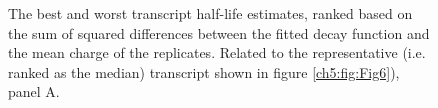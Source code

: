 \begin{figure}[ht]
    \centering
    \caption[Best and worst transcript half-life estimates.]{
    The best and worst transcript half-life estimates, ranked based on the sum of squared differences between the fitted decay function and the mean charge of the replicates.
    Related to the representative (i.e. ranked as the median) transcript shown in figure \ref{ch5:fig:Fig6}), panel A.
    }
    \label{ch5:figsupp:f6S2}
\end{figure}

